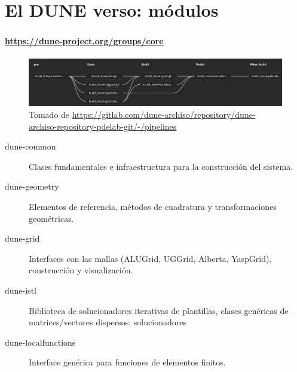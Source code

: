 \section{El DUNE verso: módulos}

\begin{frame}[fragile]
	\frametitle{\secname}
	\framesubtitle{\url{https://dune-project.org/groups/core}}

	\begin{figure}[ht!]
		\centering
		\includegraphics[width=14.6cm]{dependences}
		\caption{Tomado de \url{https://gitlab.com/dune-archiso/repository/dune-archiso-repository-pdelab-git/-/pipelines}}
	\end{figure}

	\begin{description}
		\item[dune-common]

			Clases fundamentales e infraestructura para la construcción del sistema.

		\item[dune-geometry]

			Elementos de referencia, métodos de cuadratura y transformaciones geométricas.

		\item[dune-grid]

			Interfaces con las mallas (ALUGrid, UGGrid, Alberta, YaspGrid), construcción y visualización.

		\item[dune-istl]

			Biblioteca de solucionadores iterativas de plantillas, clases genéricas de matrices/vectores dispersos, solucionadores

		\item[dune-localfunctions]

			Interface genérica para funciones de elementos finitos.
	\end{description}

\end{frame}

